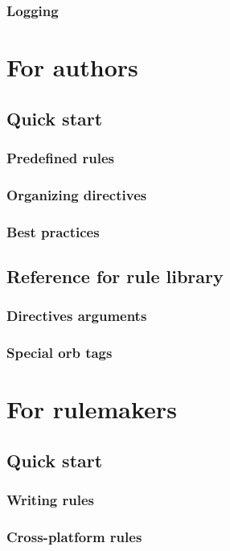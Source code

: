 \documentclass[a4paper,twoside,12pt]{memoir}
\begin{document}
\section{Logging}

\part{For authors}

\chapter{Quick start}
\section{Predefined rules}
\section{Organizing directives}
\section{Best practices}

\chapter{Reference for rule library}
\section{Directives arguments}
\section{Special orb tags}

\part{For rulemakers}

\chapter{Quick start}
\section{Writing rules}
\section{Cross-platform rules}
\end{document}
